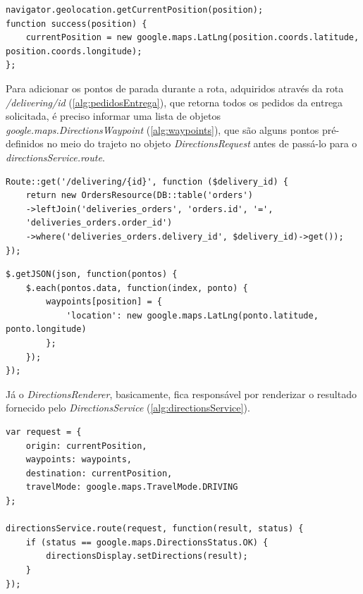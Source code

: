 \begin{lstlisting}[caption={Delivery Routes - Função de localização do usuário}, style=htmlcssjs, label=alg:currentPosition]
navigator.geolocation.getCurrentPosition(position);
function success(position) {
    currentPosition = new google.maps.LatLng(position.coords.latitude, position.coords.longitude);
};
\end{lstlisting}

Para adicionar os pontos de parada durante a rota, adquiridos através da rota \textit{/delivering/{id}} (\autoref{alg:pedidosEntrega}), que retorna todos os pedidos da entrega solicitada, é preciso informar uma lista de objetos \textit{google.maps.DirectionsWaypoint} (\autoref{alg:waypoints}), que são alguns pontos pré-definidos no meio do trajeto no objeto \textit{DirectionsRequest} antes de passá-lo para o \textit{directionsService.route}.

\begin{lstlisting}[caption={Delivery Routes - Route pedidos da entrega}, style=htmlcssjs, label=alg:pedidosEntrega]
Route::get('/delivering/{id}', function ($delivery_id) {
    return new OrdersResource(DB::table('orders')
    ->leftJoin('deliveries_orders', 'orders.id', '=', 
    'deliveries_orders.order_id')
    ->where('deliveries_orders.delivery_id', $delivery_id)->get());
});
\end{lstlisting}

\begin{lstlisting}[caption={Delivery Routes - Preenchimento dos pontos de parada}, style=htmlcssjs, label=alg:waypoints]
$.getJSON(json, function(pontos) {
    $.each(pontos.data, function(index, ponto) {
        waypoints[position] = {
            'location': new google.maps.LatLng(ponto.latitude, ponto.longitude)
        };
    });
});
\end{lstlisting}

\newpage
Já o \textit{DirectionsRenderer}, basicamente, fica responsável por renderizar o resultado fornecido pelo \textit{DirectionsService} (\autoref{alg:directionsService}).

\begin{lstlisting}[caption={Delivery Routes - Requisição de renderização do mapa}, style=htmlcssjs, label=alg:directionsService]
var request = {
    origin: currentPosition,
    waypoints: waypoints,
    destination: currentPosition,
    travelMode: google.maps.TravelMode.DRIVING
};

directionsService.route(request, function(result, status) {
    if (status == google.maps.DirectionsStatus.OK) {
        directionsDisplay.setDirections(result);
    }
});
\end{lstlisting}

